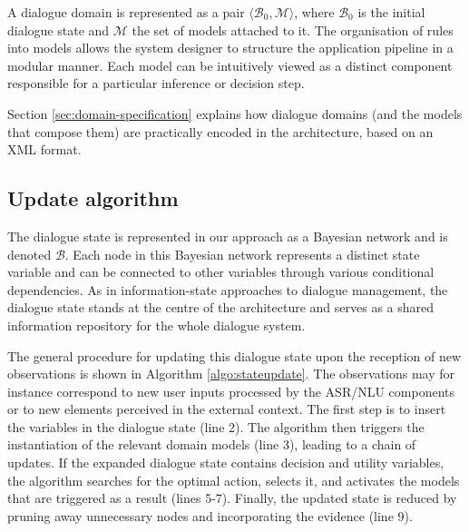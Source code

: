 A dialogue domain is represented as a pair $\langle \mathcal{B}_0, \mathcal{M} \rangle$, where $\mathcal{B}_0$ is the initial dialogue state  and $\mathcal{M}$ the set of models attached to it. The organisation of rules into models allows the system designer to structure the application pipeline in a modular manner. Each model can be intuitively viewed as a distinct component responsible for a particular inference or decision step. 

Section \ref{sec:domain-specification} explains how dialogue domains (and the models that compose them) are practically encoded in the \opendial{} architecture, based on an XML format. 

\subsection{Update algorithm} 


The dialogue state is represented in our approach as a Bayesian network and is denoted $\mathcal{B}$. Each node in this Bayesian network represents a distinct state variable and can be connected to other variables through various conditional dependencies. As in information-state approaches to dialogue management, the dialogue state stands at the centre of the architecture and serves as a shared information repository for the whole dialogue system. 

The general procedure for updating this dialogue state upon the reception of new observations is shown in Algorithm \ref{algo:stateupdate}. The observations may for instance correspond to new user inputs processed by the ASR/NLU components or to new elements perceived in the external context. The first step is to insert the variables in the dialogue state (line 2). The algorithm then triggers the instantiation of the relevant domain models (line 3), leading to a chain of updates.  If the expanded dialogue state contains decision and utility variables, the algorithm searches for the optimal action, selects it, and activates the models that are triggered as a result (lines 5-7). Finally, the updated state is reduced by pruning away unnecessary nodes and incorporating the evidence (line 9). 


